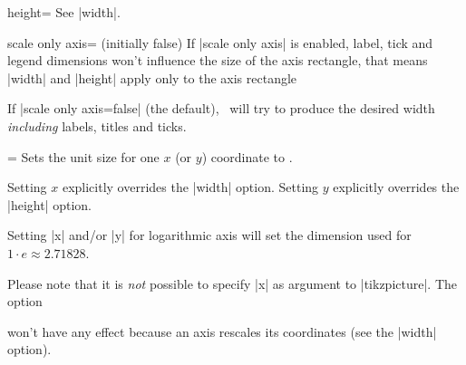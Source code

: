 \begin{pgfplotskey}{height=}
	See |width|.
\end{pgfplotskey}

\begin{pgfplotskey}{scale only axis= (initially false)}
If |scale only axis| is enabled, label, tick and legend dimensions won't influence the size of the axis rectangle, that means |width| and |height| apply only to the axis rectangle

If |scale only axis=false| (the default), \PGFPlots\ will try to produce the desired width \emph{including} labels, titles and ticks.
\end{pgfplotskey}

\begin{pgfplotsxykey}{\x=}
Sets the unit size for one $x$ (or $y$) coordinate to .

	Setting $x$ explicitly overrides the |width| option. Setting $y$ explicitly overrides the |height| option.
\begin{codeexample}[]
\end{codeexample}
	Setting |x| and/or |y| for logarithmic axis will set the dimension used for $1 \cdot e \approx 2.71828$.

	Please note that it is \emph{not} possible to specify |x| as argument to |tikzpicture|. The option 
\begin{codeexample}
\end{codeexample}
	won't have any effect because an axis rescales its coordinates (see the |width| option).
\end{pgfplotsxykey}

